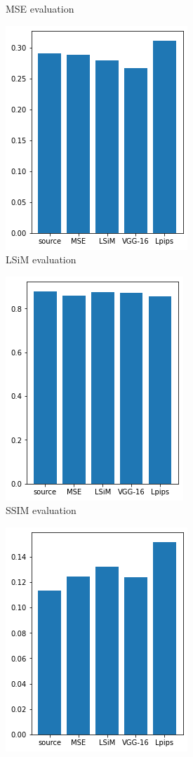\documentclass[a4paper,12pt,twoside]{report}
\begin{document}
\begin{figure}
\begin{subfigure}{0.32\textwidth}
			\caption{MSE evaluation}
		\end{subfigure}
		\begin{subfigure}{0.32\textwidth}
			\centering
			\includegraphics[scale=0.49]{buoyancy_low/lsim_eval.png}
			\caption{LSiM evaluation}
		\end{subfigure}
		\begin{subfigure}{0.32\textwidth}
			\centering
			\includegraphics[scale=0.49]{buoyancy_low/ssim.png}
			\caption{SSIM evaluation}
		\end{subfigure}
		\begin{subfigure}{0.32\textwidth}
			\centering
			\includegraphics[scale=0.49]{buoyancy_low/lpips_eval.png}

\end{subfigure}
\end{figure}
\end{document}
